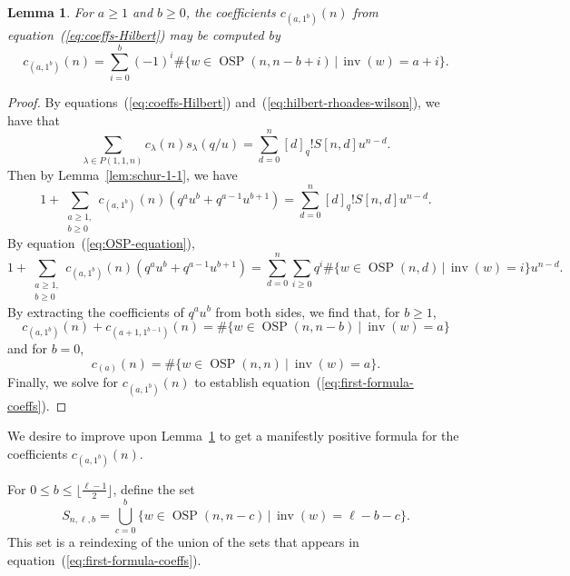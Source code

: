 \documentclass[11pt]{amsart}
\newtheorem{lemma}[theorem]{Lemma}
\theoremstyle{definition}
\newcommand{\0}{\emptyset}
\DeclareMathOperator{\OSP}{OSP}
\DeclareMathOperator{\inv}{inv}
\begin{document}
\begin{lemma}\label{lem:c_{(a,1^b)}}
    For $a \geq 1$ and $b \geq 0$, the coefficients $c_{(a,1^b)}(n)$ from equation~(\ref{eq:coeffs-Hilbert}) may be computed by
    \begin{equation}\label{eq:first-formula-coeffs}
        c_{(a,1^b)}(n) = \sum_{i=0}^b (-1)^i \#\{w \in \OSP(n,n-b+i)\, | \, \inv(w) = a+i \}.
    \end{equation}
\end{lemma}

\begin{proof}
By equations~(\ref{eq:coeffs-Hilbert}) and~(\ref{eq:hilbert-rhoades-wilson}), we have that
\begin{equation}
    \sum_{\lambda \in P(1,1,n)} c_{\lambda}(n) s_\lambda(q/u) = \sum_{d=0}^n [d]_q!S[n,d] u^{n-d}.
\end{equation}
Then by Lemma~\ref{lem:schur-1-1}, we have
\begin{equation}
    1 + \sum_{\substack{a \geq 1,\\ b \geq 0}} c_{(a,1^b)}(n)(q^au^b+q^{a-1}u^{b+1}) = \sum_{d=0}^n [d]_q!S[n,d] u^{n-d}.
\end{equation}
By equation~(\ref{eq:OSP-equation}),
\begin{equation}
    1 + \sum_{\substack{a \geq 1,\\ b \geq 0}} c_{(a,1^b)}(n)(q^au^b+q^{a-1}u^{b+1}) = \sum_{d=0}^n  \sum_{i \geq 0} q^i \# \{w \in \OSP(n,d)\, |\, \inv(w) = i \} u^{n-d}.
\end{equation}
By extracting the coefficients of $q^a u^b$ from both sides, we find that, for $b \geq 1$,
\begin{equation}
    c_{(a,1^b)}(n)+c_{(a+1,1^{b-1})}(n) = \#\{w\in \OSP(n,n-b)\ | \ \inv(w)=a\}
\end{equation}
and for $b=0$,
\begin{equation}
    c_{(a)}(n) = \#\{w\in \OSP(n,n)\ | \ \inv(w)=a\}.
\end{equation}
Finally, we solve for $c_{(a,1^b)}(n)$ to establish equation~(\ref{eq:first-formula-coeffs}).


\end{proof}

We desire to improve upon Lemma~\ref{lem:c_{(a,1^b)}} to get a manifestly positive formula for the coefficients $c_{(a,1^b)}(n)$. 

For $0 \leq b \leq {\lfloor \frac{\ell-1}{2}\rfloor}$, define the set
\begin{equation}
S_{n,\ell,b}=\bigcup_{c=0}^b  \{w\in\OSP(n,n-c)\, |\, \inv(w)=\ell-b-c\}.
\end{equation}
This set is a reindexing of the union of the sets that appears in equation~(\ref{eq:first-formula-coeffs}).
\end{document}
